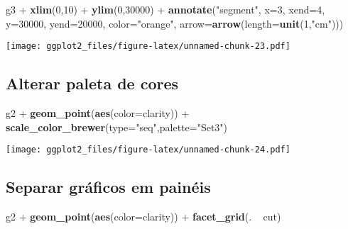 \documentclass[]{article}
\newenvironment{Shaded}{\begin{snugshade}}{\end{snugshade}}
\newcommand{\KeywordTok}[1]{\textcolor[rgb]{0.13,0.29,0.53}{\textbf{{#1}}}}
\newcommand{\DataTypeTok}[1]{\textcolor[rgb]{0.13,0.29,0.53}{{#1}}}
\newcommand{\DecValTok}[1]{\textcolor[rgb]{0.00,0.00,0.81}{{#1}}}
\newcommand{\StringTok}[1]{\textcolor[rgb]{0.31,0.60,0.02}{{#1}}}
\newcommand{\NormalTok}[1]{{#1}}
\begin{document}
\begin{Shaded}
\begin{Highlighting}[]
\NormalTok{g3 +}\StringTok{ }\KeywordTok{xlim}\NormalTok{(}\DecValTok{0}\NormalTok{,}\DecValTok{10}\NormalTok{) +}\StringTok{ }\KeywordTok{ylim}\NormalTok{(}\DecValTok{0}\NormalTok{,}\DecValTok{30000}\NormalTok{) +}
\StringTok{    }\KeywordTok{annotate}\NormalTok{(}\StringTok{"segment"}\NormalTok{, }\DataTypeTok{x=}\DecValTok{3}\NormalTok{, }\DataTypeTok{xend=}\DecValTok{4}\NormalTok{, }\DataTypeTok{y=}\DecValTok{30000}\NormalTok{, }\DataTypeTok{yend=}\DecValTok{20000}\NormalTok{,}
             \DataTypeTok{color=}\StringTok{"orange"}\NormalTok{, }\DataTypeTok{arrow=}\KeywordTok{arrow}\NormalTok{(}\DataTypeTok{length=}\KeywordTok{unit}\NormalTok{(}\DecValTok{1}\NormalTok{,}\StringTok{"cm"}\NormalTok{)))}
\end{Highlighting}
\end{Shaded}

\texttt{[image: ggplot2\_files/figure-latex/unnamed-chunk-23.pdf]}

\newpage

\subsection{Alterar paleta de cores}\label{alterar-paleta-de-cores}

\begin{Shaded}
\begin{Highlighting}[]
\NormalTok{g2 +}\StringTok{ }\KeywordTok{geom_point}\NormalTok{(}\KeywordTok{aes}\NormalTok{(}\DataTypeTok{color=}\NormalTok{clarity)) +}\StringTok{ }\KeywordTok{scale_color_brewer}\NormalTok{(}\DataTypeTok{type=}\StringTok{"seq"}\NormalTok{,}\DataTypeTok{palette=}\StringTok{"Set3"}\NormalTok{)}
\end{Highlighting}
\end{Shaded}

\texttt{[image: ggplot2\_files/figure-latex/unnamed-chunk-24.pdf]}

\newpage

\subsection{Separar gráficos em
painéis}\label{separar-graficos-em-paineis}

\begin{Shaded}
\begin{Highlighting}[]
\NormalTok{g2 +}\StringTok{ }\KeywordTok{geom_point}\NormalTok{(}\KeywordTok{aes}\NormalTok{(}\DataTypeTok{color=}\NormalTok{clarity)) +}\StringTok{ }\KeywordTok{facet_grid}\NormalTok{(. ~}\StringTok{ }\NormalTok{cut)}
\end{Highlighting}
\end{Shaded}
\end{document}
